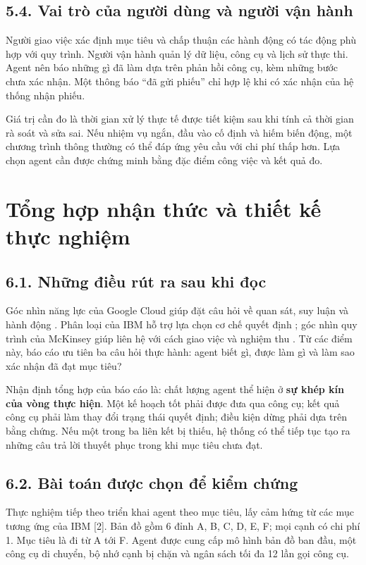 \documentclass[11pt,a4paper]{article}
\begin{document}
\subsection{5.4. Vai trò của người dùng và người vận hành}
Người giao việc xác định mục tiêu và chấp thuận các hành động có tác động phù hợp với
quy trình. Người vận hành quản lý dữ liệu, công cụ và lịch sử thực thi. Agent nên báo
những gì đã làm dựa trên phản hồi công cụ, kèm những bước chưa xác nhận. Một thông báo
``đã gửi phiếu'' chỉ hợp lệ khi có xác nhận của hệ thống nhận phiếu.

Giá trị cần đo là thời gian xử lý thực tế được tiết kiệm sau khi tính cả thời gian rà
soát và sửa sai. Nếu nhiệm vụ ngắn, đầu vào cố định và hiếm biến động, một chương trình
thông thường có thể đáp ứng yêu cầu với chi phí thấp hơn. Lựa chọn agent cần được chứng
minh bằng đặc điểm công việc và kết quả đo.

\newpage
\section{Tổng hợp nhận thức và thiết kế thực nghiệm}
\subsection{6.1. Những điều rút ra sau khi đọc}
Góc nhìn năng lực của Google Cloud giúp đặt câu hỏi về quan sát, suy luận và hành động
\cite{google}. Phân loại của IBM hỗ trợ lựa chọn cơ chế quyết định \cite{ibm}; góc nhìn
quy trình của McKinsey giúp liên hệ với cách giao việc và nghiệm thu \cite{mckinsey}.
Từ các điểm này, báo cáo ưu tiên ba câu hỏi thực hành: agent biết gì, được làm gì và làm
sao xác nhận đã đạt mục tiêu?

Nhận định tổng hợp của báo cáo là: chất lượng agent thể hiện ở \textbf{sự khép kín của vòng
thực hiện}. Một kế hoạch tốt phải được đưa qua công cụ; kết quả công cụ phải làm thay
đổi trạng thái quyết định; điều kiện dừng phải dựa trên bằng chứng. Nếu một trong ba
liên kết bị thiếu, hệ thống có thể tiếp tục tạo ra những câu trả lời thuyết phục trong
khi mục tiêu chưa đạt.

\subsection{6.2. Bài toán được chọn để kiểm chứng}
Thực nghiệm tiếp theo triển khai agent theo mục tiêu, lấy cảm hứng từ các mục tương ứng
của IBM [2]. Bản đồ gồm 6 đỉnh A, B, C, D, E, F; mọi cạnh có chi phí 1. Mục tiêu là đi
từ A tới F. Agent được cung cấp mô hình bản đồ ban đầu, một công cụ di chuyển, bộ nhớ
cạnh bị chặn và ngân sách tối đa 12 lần gọi công cụ.
\end{document}
